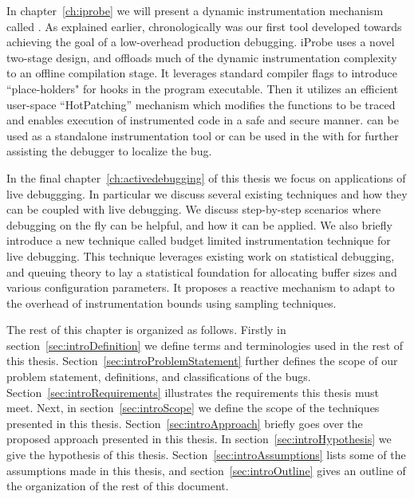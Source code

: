 In chapter~\ref{ch:iprobe} we will present a dynamic instrumentation mechanism called \iprobe.
As explained earlier, chronologically \iprobe was our first tool developed towards achieving the goal of a low-overhead production debugging.
iProbe uses a novel two-stage design, and offloads much of the dynamic instrumentation complexity to an offline compilation stage.
It leverages standard compiler flags to introduce ``place-holders" for hooks in the program executable.
Then it utilizes an efficient user-space ``HotPatching'' mechanism which modifies the functions to be traced and enables execution of instrumented code in a safe and secure manner.
\iprobe can be used as a standalone instrumentation tool or can be used in the \debugcontainer with \parikshan for further assisting the debugger to localize the bug.

In the final chapter~\ref{ch:activedebugging} of this thesis we focus on applications of live debuggging. 
In particular we discuss several existing techniques and how they can be coupled with live debugging. 
We discuss step-by-step scenarios where debugging on the fly can be helpful, and how it can be applied.
We also briefly introduce a new technique called budget limited instrumentation technique for live debugging.
This technique leverages existing work on statistical debugging, and queuing theory to lay a statistical foundation for allocating buffer sizes and various configuration parameters.
It proposes a reactive mechanism to adapt to the overhead of instrumentation bounds using sampling techniques.


The rest of this chapter is organized as follows.
Firstly in section~\ref{sec:introDefinition} we define terms and terminologies used in the rest of this thesis.
Section~\ref{sec:introProblemStatement} further defines the scope of our problem statement, definitions, and classifications of the bugs.
Section~\ref{sec:introRequirements} illustrates the requirements this thesis must meet.
Next, in section~\ref{sec:introScope} we define the scope of the techniques presented in this thesis.
Section~\ref{sec:introApproach} briefly goes over the proposed approach presented in this thesis.
In section~\ref{sec:introHypothesis} we give the hypothesis of this thesis.
Section~\ref{sec:introAssumptions} lists some of the assumptions made in this thesis, and section~\ref{sec:introOutline} gives an outline of the organization of the rest of this document.

